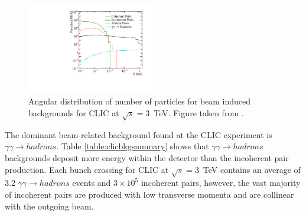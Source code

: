 \begin{figure}[h!]
\includegraphics[width=0.5\textwidth]{Introduction/Plots/CDRPlots/BackgroundAngleCut.pdf}
\caption[Angular distribution of number of particles for beam induced backgrounds for CLIC at $\sqrt{s}=3$~TeV.  Figure taken from \cite{Linssen:2012hp}.]{Angular distribution of number of particles for beam induced backgrounds for CLIC at $\sqrt{s}=3$~TeV.  Figure taken from \cite{Linssen:2012hp}.}
\label{fig:backgroundangle}
\end{figure}

The dominant beam-related background found at the CLIC experiment is $\gamma\gamma \rightarrow hadrons$.  Table \ref{table:clicbkgsummary} shows that $\gamma\gamma \rightarrow hadrons$ backgrounds deposit more energy within the detector than the incoherent pair production.  Each bunch crossing for CLIC at $\sqrt{s}=3$~TeV contains an average of 3.2 $\gamma\gamma \rightarrow hadrons$ events and $3\times10^{5}$ incoherent pairs, however, the vast majority of incoherent pairs are produced with low transverse momenta and are collinear with the outgoing beam.

